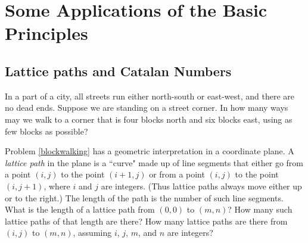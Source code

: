 \section{Some Applications of the Basic Principles}

\subsection{Lattice paths and Catalan Numbers} 
\bp
\itemm In a part of a city, all streets run either north-south or east-west,
and there are no dead ends.  Suppose we are standing on a street corner.  In
how many ways may we walk to a corner that is four blocks north and six blocks
east, using as few blocks as possible?\label{blockwalking}

\itemes Problem \ref{blockwalking} has a geometric interpretation in a
coordinate plane.  A {\em lattice path} in the plane is a ``curve" made up of line segments
that either go from a point
$(i,j)$ to the point
$(i+1,j)$ or from a point $(i,j)$ to the point $(i,j+1)$, where $i$ and $j$
are integers. (Thus lattice paths always move either up or to the right.) The
length of the path is the number of such line segments.  What is the length
of a  lattice path from
$(0,0)$ to
$(m,n)$?    How many such lattice paths of that length are
there? How many lattice paths are there from $(i,j)$ to $(m,n)$,
assuming $i$,
$j$,
$m$, and
$n$ are integers?\label{latticepaths}


